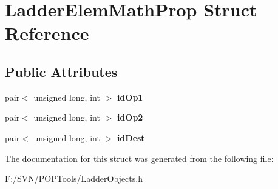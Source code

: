 \hypertarget{struct_ladder_elem_math_prop}{\section{Ladder\-Elem\-Math\-Prop Struct Reference}
\label{struct_ladder_elem_math_prop}
}
\subsection*{Public Attributes}
\begin{DoxyCompactItemize}
\item 
\hypertarget{struct_ladder_elem_math_prop_a34a443fae4353db39ae5c75eace145af}{pair$<$ unsigned long, int $>$ {\bfseries id\-Op1}}\label{struct_ladder_elem_math_prop_a34a443fae4353db39ae5c75eace145af}

\item 
\hypertarget{struct_ladder_elem_math_prop_a2751dca59c72e68e81446bbc6ea87ab0}{pair$<$ unsigned long, int $>$ {\bfseries id\-Op2}}\label{struct_ladder_elem_math_prop_a2751dca59c72e68e81446bbc6ea87ab0}

\item 
\hypertarget{struct_ladder_elem_math_prop_ac985d7e9381d7767e3d348cdf774e948}{pair$<$ unsigned long, int $>$ {\bfseries id\-Dest}}\label{struct_ladder_elem_math_prop_ac985d7e9381d7767e3d348cdf774e948}

\end{DoxyCompactItemize}


The documentation for this struct was generated from the following file\-:\begin{DoxyCompactItemize}
\item 
F\-:/\-S\-V\-N/\-P\-O\-P\-Tools/Ladder\-Objects.\-h\end{DoxyCompactItemize}

